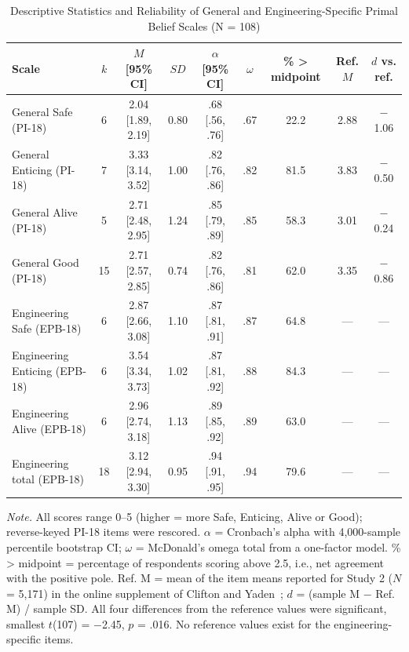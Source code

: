 \documentclass[journal,a4paper]{IEEEtran}
\begin{document}
\begin{table}[tp]
\centering
\renewcommand{\arraystretch}{1.12}
\footnotesize
\caption{Descriptive Statistics and Reliability of General and Engineering-Specific Primal Belief Scales (N = 108)}
\label{tab:t1}
\begin{tabular}{>{\raggedright\arraybackslash}p{4.3cm}cccccccc}
\toprule
\textbf{Scale} & $k$ & $M$ [95\% CI] & $SD$ & $\alpha$ [95\% CI] & $\omega$ & \% > midpoint & Ref. $M$ & $d$ vs. ref. \\
\midrule
General Safe (PI-18) & 6 & 2.04 [1.89, 2.19] & 0.80 & .68 [.56, .76] & .67 & 22.2 & 2.88 & $-$1.06 \\
General Enticing (PI-18) & 7 & 3.33 [3.14, 3.52] & 1.00 & .82 [.76, .86] & .82 & 81.5 & 3.83 & $-$0.50 \\
General Alive (PI-18) & 5 & 2.71 [2.48, 2.95] & 1.24 & .85 [.79, .89] & .85 & 58.3 & 3.01 & $-$0.24 \\
General Good (PI-18) & 15 & 2.71 [2.57, 2.85] & 0.74 & .82 [.76, .86] & .81 & 62.0 & 3.35 & $-$0.86 \\
Engineering Safe (EPB-18) & 6 & 2.87 [2.66, 3.08] & 1.10 & .87 [.81, .91] & .87 & 64.8 & — & — \\
Engineering Enticing (EPB-18) & 6 & 3.54 [3.34, 3.73] & 1.02 & .87 [.81, .92] & .88 & 84.3 & — & — \\
Engineering Alive (EPB-18) & 6 & 2.96 [2.74, 3.18] & 1.13 & .89 [.85, .92] & .89 & 63.0 & — & — \\
Engineering total (EPB-18) & 18 & 3.12 [2.94, 3.30] & 0.95 & .94 [.91, .95] & .94 & 79.6 & — & — \\
\bottomrule
\end{tabular}

\vspace{2pt}\parbox{\textwidth}{\scriptsize \emph{Note.} All scores range 0–5 (higher = more Safe, Enticing, Alive or Good); reverse-keyed PI-18 items were rescored. $\alpha$ = Cronbach's alpha with 4,000-sample percentile bootstrap CI; $\omega$ = McDonald's omega total from a one-factor model. \% > midpoint = percentage of respondents scoring above 2.5, i.e., net agreement with the positive pole. Ref. M = mean of the item means reported for Study 2 ($N$ = 5,171) in the online supplement of Clifton and Yaden~\cite{cliftonyaden2021}; $d$ = (sample M $-$ Ref. M) / sample SD. All four differences from the reference values were significant, smallest $t$(107) = $-$2.45, $p$ = .016. No reference values exist for the engineering-specific items.}
\end{table}
\end{document}
